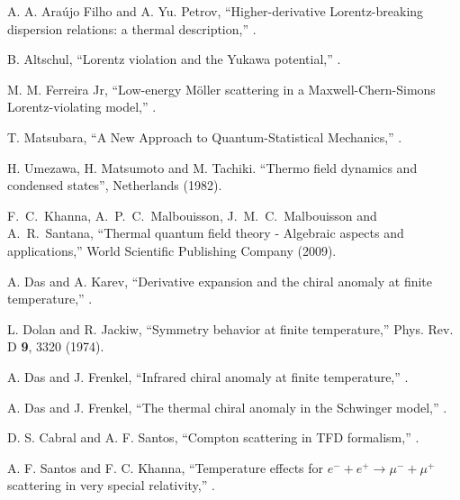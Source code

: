 \documentclass[11pt,showpacs,preprintnumbers,amsmath,amssymb,prd,nofootinbib,superscriptaddress]{revtex4-2}
\begin{document}
\begin{thebibliography}{99}
 A. A. Ara\'{u}jo Filho and A. Yu. Petrov, ``Higher-derivative Lorentz-breaking dispersion relations: a thermal description,'' .

 B. Altschul, ``Lorentz violation and the Yukawa potential,'' .

 M. M. Ferreira Jr, ``Low-energy M\"oller scattering in a Maxwell-Chern-Simons Lorentz-violating model,'' .

 T. Matsubara, ``A New Approach to Quantum-Statistical Mechanics,'' .

 H. Umezawa, H. Matsumoto and M. Tachiki. ``Thermo field dynamics and condensed states'', Netherlands (1982).

  F.~C.~Khanna, A.~P.~C.~Malbouisson, J.~M.~C.~Malbouisson and A.~R.~Santana,
``Thermal quantum field theory - Algebraic aspects and applications,''
World Scientific Publishing Company (2009).

 A. Das and A. Karev, ``Derivative expansion and the chiral anomaly at finite temperature,'' .

 L. Dolan and R. Jackiw, ``Symmetry behavior at finite temperature,''  {{Phys. Rev. D} {\bf 9}, 3320 (1974)}.

 A. Das and J. Frenkel, ``Infrared chiral anomaly at finite temperature,'' .

 A. Das and J. Frenkel, ``The thermal chiral anomaly in the Schwinger model,'' .

 D. S. Cabral and A. F. Santos, ``Compton scattering in TFD formalism,'' .

 A. F. Santos and F. C. Khanna, ``Temperature effects for \( e^- + e^+ \rightarrow \mu^- + \mu^+ \) scattering in very special relativity,'' .


\end{thebibliography}
\end{document}
